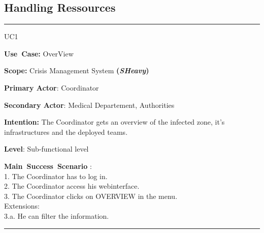 \subsection{Handling Ressources}
\vspace{0.5cm}
\hrule
\vspace{0.5cm}
\begin{lyxlist}{UC1}
\small{
\item [\textbf{Use~Case:}] OverView
\item [\textbf{Scope:}] Crisis Management System \textbf{(\emph{SHeavy})}
\item [\textbf{Primary Actor}:] Coordinator
\item [\textbf{Secondary Actor}:] Medical Departement, Authorities
\item [\textbf{Intention:}] The Coordinator gets an overview of the infected
zone, it's infrastructures and the deployed teams.
\item [\textbf{Level}:]Sub-functional level
\item [\textbf{Main~Success~Scenario}]:\\
1. The Coordinator has to log in.\\
2. The Coordinator access his webinterface.\\
3. The Coordinator clicks on OVERVIEW in the menu.\\
Extensions:\\
	3.a. He can filter the information.\\
}
\end{lyxlist}
\hrule
\vspace{0.5cm} 

